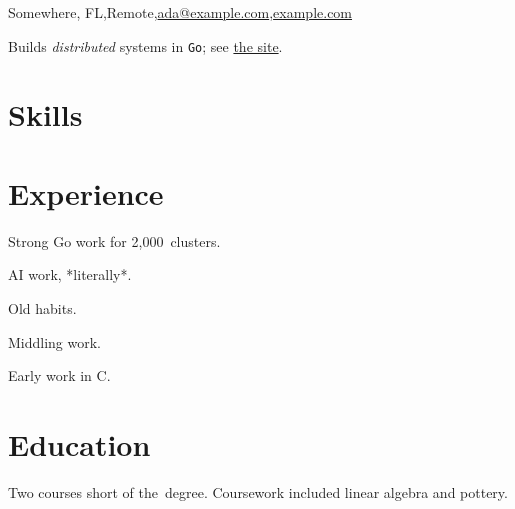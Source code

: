 \documentclass{jrresume}
\begin{document}
  {Somewhere, FL\sep{}Remote\sep{}\href{mailto:ada@example.com}{ada@example.com}\sep{}\href{https://example.com}{example.com}}

Builds \emph{distributed} systems in \texttt{Go}; see \href{https://example.com}{the site}.

\section{Skills}

\section{Experience}

\begin{highlights}
  \item {} Strong Go work for 2,000~clusters.
  \item {} AI work, *literally*.
  \item Old habits.
\end{highlights}

\begin{highlights}
  \item Middling work.
\end{highlights}

\begin{highlights}
  \item Early work in C.
\end{highlights}


\section{Education}

Two courses short of the~degree. Coursework included linear algebra and pottery.
\end{document}
